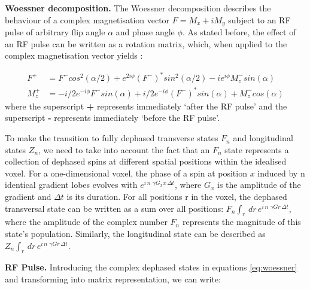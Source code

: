\hfill

\textbf{Woessner decomposition.} The Woessner decomposition describes the behaviour of a complex magnetisation vector $F = M_x + i M_y$ subject to an RF pulse of arbitrary flip angle $\alpha$ and phase angle $\phi$.
As stated before, the effect of an RF pulse can be written as a rotation matrix, which, when applied to the complex magnetisation vector yields \cite{Haacke1999} \cite{Scheffler1999}:

\begin{equation}\label{eq:woessner}
\begin{split}
    F^+ &= F^- cos^2(\alpha/2) + e^{2i\phi} (F^-)^* sin^2(\alpha/2)  - i e^{i \phi} M_z^- sin(\alpha)  \\
    M_z^+ &= - i/2 e^{-i \phi} F^- sin(\alpha) + i/2 e^{-i \phi} (F^-)^* sin(\alpha) + M_z^- cos(\alpha) 
\end{split}
\end{equation}
where the superscript \textbf{+} represents immediately `after the RF pulse' and the superscript \textbf{-} represents immediately `before the RF pulse'.

\hfill

To make the transition to fully dephased transverse states $F_n$ and longitudinal states $Z_n$, we need to take into account the fact that an $F_n$ state represents a collection of dephased spins at different spatial positions within the idealised voxel.
For a one-dimensional voxel, the phase of a spin at position $x$ induced by n identical gradient lobes evolves with $e^{i \, n \, \, \gamma G_x x \, \Delta t }$, where $G_x$ is the amplitude of the gradient and $\Delta t$ is its duration.
For all positions r in the voxel, the dephased transversal state can be written as a sum over all positions: $ F_n \int_r \, dr \, e^{i \, n \, \, \gamma G r \, \Delta t }$, where the amplitude of the complex number $F_n$ represents the magnitude of this state's population.
Similarly, the longitudinal state can be described as $ Z_n \int_r \, dr \, e^{i \, n \, \, \gamma G r \, \Delta t }$.

\hfill

\textbf{RF Pulse. } Introducing the complex dephased states in equations \ref{eq:woessner} and transforming into matrix representation, we can write:

